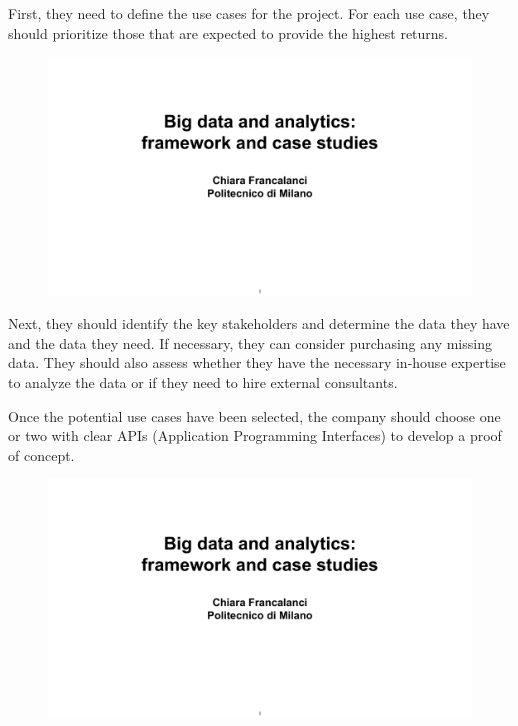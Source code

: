 First, they need to define the use cases for the project. For each use
case, they should prioritize those that are expected to provide the
highest returns.

\begin{figure}[!h]
    \centering
    \includegraphics[page=85, trim = 1cm 1.5cm 1cm 4.5cm, clip, width=\textwidth]{images/06 - BIG_DATA.pdf}
\end{figure}

Next, they should identify the key stakeholders and determine the data
they have and the data they need. If necessary, they can consider
purchasing any missing data. They should also assess whether they have
the necessary in-house expertise to analyze the data or if they need to
hire external consultants.

Once the potential use cases have been selected, the company should
choose one or two with clear APIs (Application Programming Interfaces)
to develop a proof of concept.

\begin{figure}[!h]
    \centering
    \includegraphics[page=86, trim = 1cm 1.5cm 1.5cm 3.5cm, clip, width=\textwidth]{images/06 - BIG_DATA.pdf}
\end{figure}

